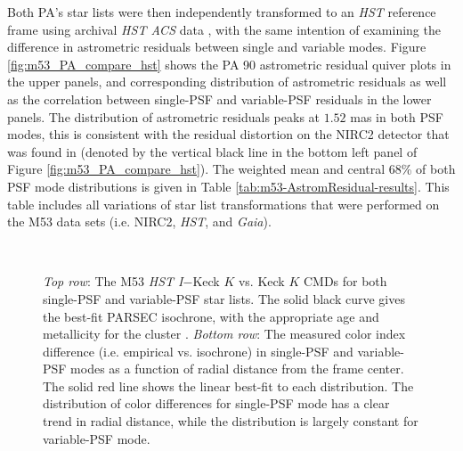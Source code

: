 \documentclass[]{spie}  %
\begin{document}
\indent Both PA's star lists were then independently transformed to an \textit{HST} reference frame using archival \textit{HST ACS} data \cite{service:2016a}, with the same intention of examining the difference in astrometric residuals between single and variable modes. Figure \ref{fig:m53_PA_compare_hst} shows the PA 90 astrometric residual quiver plots in the upper panels, and corresponding distribution of astrometric residuals as well as the correlation between single-PSF and variable-PSF residuals in the lower panels. The distribution of astrometric residuals peaks at $1.52$ mas in both PSF modes, this is consistent with the residual distortion on the NIRC2 detector that was found in \cite{service:2016a} (denoted by the vertical black line in the bottom left panel of Figure \ref{fig:m53_PA_compare_hst}). The weighted mean and central 68\% of both PSF mode distributions is given in Table \ref{tab:m53-AstromResidual-results}. This table includes all variations of star list transformations that were performed on the M53 data sets (i.e. NIRC2, \textit{HST}, and \textit{Gaia}). 

\begin{figure}[!h]
  \centering
  \\
  \hspace{-1.2cm}
  \caption{\textit{Top row}: The M53 \textit{HST I}$-$Keck $K$ vs. Keck $K$ CMDs for both single-PSF and variable-PSF star lists. The solid black curve gives the best-fit PARSEC isochrone, with the appropriate age and metallicity for the cluster \cite{dotter:2011a,wagner:2016a}. \textit{Bottom row}: The measured color index difference (i.e. empirical vs. isochrone) in single-PSF and variable-PSF modes as a function of radial distance from the frame center. The solid red line shows the linear best-fit to each distribution. The distribution of color differences for single-PSF mode has a clear trend in radial distance, while the distribution is largely constant for variable-PSF mode.} \label{fig:m53_cmd_colorshift}
\end{figure}
\end{document}
